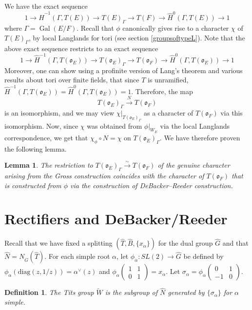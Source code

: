 \documentclass[11pt]{amsart}
\theoremstyle{plain}
\newtheorem{lemma}[enumi]{Lemma}
\newtheorem{definition}[enumi]{Definition}
\DeclareMathOperator{\Gal}{Gal}
\newcommand{\mat}[4]{\left( \begin{array}{cc} {#1} & {#2} \\ {#3} & {#4}
\end{array} \right)}
\begin{document}
We have the exact sequence $$1 \rightarrow \hat{H}^{-1}(\Gamma, T(E)) \rightarrow T(E)_{\Gamma} \rightarrow T(F) \rightarrow \hat{H}^0(\Gamma, T(E)) \rightarrow 1$$ where $\Gamma = \Gal(E/F)$.  Recall that $\phi$ canonically gives rise to a character $\chi$ of $T(E)_{\Gamma}$, by local Langlands for tori (see section \ref{groupsoftypeL}).  Note that the above exact sequence restricts to an exact sequence
$$1 \rightarrow \hat{H}^{-1}(\Gamma, T(\mathfrak{o}_E)) \rightarrow T(\mathfrak{o}_E)_{\Gamma} \rightarrow T(\mathfrak{o}_F) \rightarrow \hat{H}^0(\Gamma, T(\mathfrak{o}_E)) \rightarrow 1$$
Moreover, one can show using a profinite version of Lang's theorem and various results about tori over finite fields, that since $T$ is unramified, $\hat{H}^{-1}(\Gamma, T(\mathfrak{o}_E)) = \hat{H}^0(\Gamma, T(\mathfrak{o}_E)) = 1$.  Therefore, the map $$T(\mathfrak{o}_E)_{\Gamma} \xrightarrow{N} T(\mathfrak{o}_F)$$ is an isomorphism, and we may view $\chi|_{T(\mathfrak{o}_E)_{\Gamma}}$ as a character of $T(\mathfrak{o}_F)$ via this isomorphism.  Now, since $\chi$ was obtained from $\phi|_{W_E}$ via the local Langlands correspondence, we get that $\chi_{\phi} \circ N = \chi$ on $T(\mathfrak{o}_E)_{\Gamma}$.  We have therefore proven the following lemma.

\begin{lemma}\label{grossanddebackerreedercompatibility}
The restriction to $T(\mathfrak{o}_E)_{\Gamma} \xrightarrow{\sim} T(\mathfrak{o}_F)$ of the genuine character arising from the Gross construction coincides with the character of $T(\mathfrak{o}_F)$ that is constructed from $\phi$ via the construction of DeBacker--Reeder construction.
\end{lemma}

\section{Rectifiers and DeBacker/Reeder}

Recall that we have fixed a splitting $(\hat{T}, \hat{B}, \{x_{\alpha} \})$ for the dual group $\hat{G}$ and that $\hat{N} = N_{\hat{G}}(\hat{T})$.  For each simple root $\alpha$, let $\phi_{\alpha} : SL(2) \rightarrow \hat{G}$ be defined by $\phi_{\alpha}(\mathrm{diag}(z,1/z)) = \alpha^{\vee}(z)$ and $\phi_{\alpha}\mat{1}{1}{0}{1} = x_{\alpha}$. Let $\sigma_{\alpha} = \phi_{\alpha}\mat{0}{1}{-1}{0}$.

\begin{definition}
The Tits group $\widetilde{W}$ is the subgroup of $\hat{N}$ generated by $\{\sigma_{\alpha} \}$ for $\alpha$ simple.
\end{definition}
\end{document}
